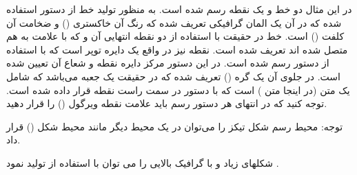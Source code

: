 در این مثال دو خط و یک نقطه رسم شده است. به منظور تولید خط از دستور  استفاده شده که در آن یک المان گرافیکی تعریف شده که رنگ آن خاکستری () و ضخامت آن کلفت () است. خط در حقیقت با استفاده از دو نقطه انتهایی آن  و  که با علامت \lr{--} به هم متصل شده اند تعریف شده است. نقطه نیز در واقع یک دایره توپر است که با استفاده از دستور  رسم شده است. در این دستور مرکز دایره نقطه  و شعاع آن \lr{(2pt)} تعیین شده است. در جلوی آن یک گره () تعریف شده که در حقیقت یک جعبه می‌باشد که شامل یک متن (در اینجا متن ) است که با دستور \lr{[anchor=west]} در سمت راست نقطه قرار داده شده است. توجه کنید که در انتهای هر دستور رسم باید علامت نقطه ویرگول (\lr{;}) را قرار دهید.

توجه: محیط رسم شکل تیکز را می‌توان در یک محیط دیگر مانند محیط شکل () قرار داد. 

شکلهای زیاد و با گرافیک بالایی را می توان با استفاده از  تولید نمود .
\usetikzlibrary{lindenmayersystems}






\newcommand\drawsnowflake[2][scale=0.2]{
    \tikz[#1]
    \foreach \a in {0,60,...,300}  {
    \draw[rotate=\a,#2] l-system;
    };
}

